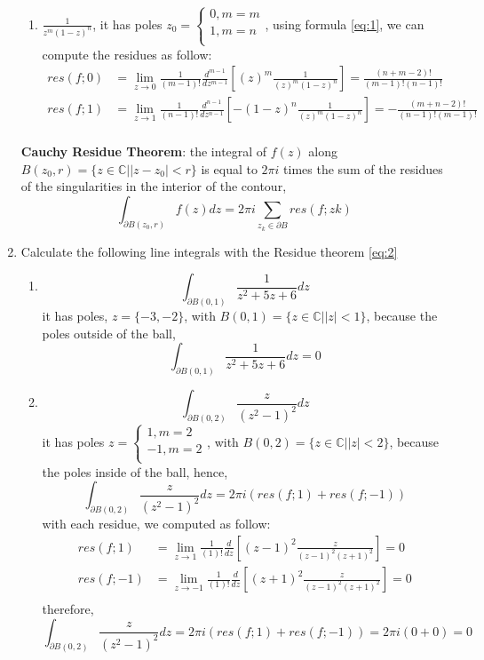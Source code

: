 \documentclass[a4paper,12pt]{article}
\newcommand{\C}{\mathbb{C}}
\begin{document}
\begin{enumerate}
\begin{enumerate}
		\item $\frac{1}{z^m(1-z)^n}$, it has poles $z_0=\begin{cases}
		0, m= m\\
		1, m= n\\
		\end{cases}$, using formula \eqref{eq:1}, we can compute the residues as follow:
		\begin{equation*}
		\begin{aligned}
		res(f;0) &= \lim_{z\to 0} \frac{1}{(m-1)!} \frac{d^{m-1}}{dz^{m-1}} \left[ (z)^m \frac{1}{(z)^m(1-z)^n}\right] = \frac{(n+m-2)!}{(m-1)!(n-1)!}\\
		res(f;1) &= \lim_{z\to 1} \frac{1}{(n-1)!} \frac{d^{n-1}}{dz^{n-1}} \left[ -(1-z)^n \frac{1}{(z)^m(1-z)^n}\right] = - \frac{(m+n-2)!}{(n-1)!(m-1)!}\\
		\end{aligned}
		\end{equation*}
	\end{enumerate}

\textbf{Cauchy Residue Theorem}: the integral of $f(z)$ along $B(z_0,r) = \{z\in \C | |z-z_0|<r\}$ is equal to $2\pi i$ times the sum of the residues of the singularities in the interior of the contour,
\begin{equation}\label{eq:2}
\int_{\partial B(z_0,r)} f(z)dz = 2\pi i \sum\limits_{z_k\in \partial B} res(f;zk)
\end{equation}
\item Calculate the following line integrals with the Residue theorem \eqref{eq:2}
\begin{enumerate}
	\item $$\int_{\partial B(0,1)} \frac{1}{z^2+5z+6}dz$$ it has poles, $z=\{-3,-2\}$, with $B(0,1) = \{z\in \C | |z|<1\}$, because the poles outside of the ball, $$\int_{\partial B(0,1)} \frac{1}{z^2+5z+6}dz = 0$$
	
	\item $$\int_{\partial B(0,2)} \frac{z}{(z^2-1)^2}dz$$ it has poles $z=\begin{cases}
	1, m= 2\\
	-1, m= 2\\
	\end{cases}$, with $B(0,2) = \{z\in \C | |z|<2\}$, because the poles inside of the ball, hence, $$\int_{\partial B(0,2)} \frac{z}{(z^2-1)^2}dz = 2\pi i (res(f;1) + res(f;-1))$$
	with each residue, we computed as follow:
	\begin{equation*}
	\begin{aligned}
	res(f;1) &= \lim_{z\to 1} \frac{1}{(1)!} \frac{d}{dz} \left[ (z-1)^2 \frac{z}{(z-1)^2(z+1)^2}\right] = 0\\
	res(f;-1) &= \lim_{z\to -1} \frac{1}{(1)!} \frac{d}{dz} \left[ (z+1)^2 \frac{z}{(z-1)^2(z+1)^2}\right] = 0\\
	\end{aligned}
	\end{equation*}
	therefore,
	$$\int_{\partial B(0,2)} \frac{z}{(z^2-1)^2}dz = 2\pi i (res(f;1) + res(f;-1)) = 2\pi i (0 + 0) = 0$$
	

\end{enumerate}
\end{enumerate}
\end{document}
